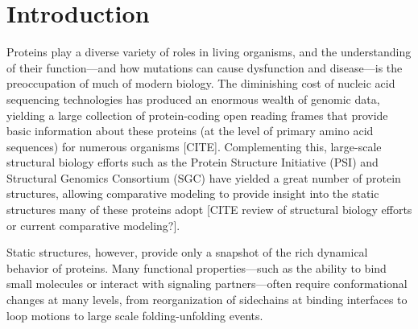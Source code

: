 \documentclass[aps,pre,twocolumn,nofootinbib,superscriptaddress,linenumbers]{revtex4-1}
\begin{document}
\maketitle

\section{Introduction}
\label{section:introduction}

Proteins play a diverse variety of roles in living organisms, and the understanding of their function---and how mutations can cause dysfunction and disease---is the preoccupation of much of modern biology. 
The diminishing cost of nucleic acid sequencing technologies has produced an enormous wealth of genomic data, yielding a large collection of protein-coding open reading frames that provide basic information about these proteins (at the level of primary amino acid sequences) for numerous organisms [CITE]. 
Complementing this, large-scale structural biology efforts such as the Protein Structure Initiative (PSI) and Structural Genomics Consortium (SGC) have yielded a great number of protein structures, allowing comparative modeling to provide insight into the static structures many of these proteins adopt [CITE review of structural biology efforts or current comparative modeling?].

Static structures, however, provide only a snapshot of the rich dynamical behavior of proteins.
Many functional properties---such as the ability to bind small molecules or interact with signaling partners---often require conformational changes at many levels, from reorganization of sidechains at binding interfaces to loop motions to large scale folding-unfolding events.
\end{document}
